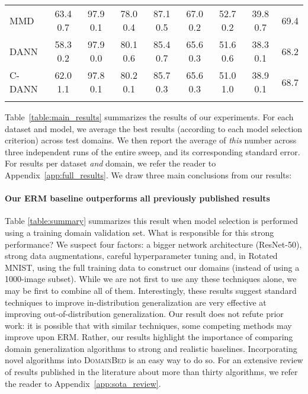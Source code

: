 \documentclass{article}
\newcommand{\domainbed}{\textsc{DomainBed}\xspace}
\newcommand{\coloredBelowRuleSep}[1]{
    \arrayrulecolor{#1}
    \specialrule{\belowrulesep}{0pt}{0pt}
    \arrayrulecolor{black}
}
\newcommand{\coloredBottomrule}[1]{
    \arrayrulecolor{#1}
    \specialrule{\aboverulesep}{0pt}{0pt}
    \arrayrulecolor{black}
    \specialrule{\heavyrulewidth}{0pt}{0pt}
    \coloredBelowRuleSep{white}
}
\begin{document}
\begin{table}
\begin{center}
{\begin{tabular}{lcccccccc}
MMD                       & 63.4  0.7            & 97.9  0.1            & 78.0  0.4            & 87.1  0.5            & 67.0  0.2            & 52.7  0.2            & 39.8  0.7 & 69.4\\
DANN                      & 58.3  0.2            & 97.9  0.0            & 80.1  0.6            & 85.4  0.7            & 65.6  0.3            & 51.6  0.6            & 38.3  0.1 & 68.2\\
C-DANN                    & 62.0  1.1            & 97.8  0.1            & 80.2  0.1            & 85.7  0.3            & 65.6  0.3            & 51.0  1.0            & 38.9  0.1 & 68.7\\
\coloredBottomrule{alternateRowColor}
\end{tabular}}
\end{center}
\end{table}

Table~\ref{table:main_results} summarizes the results of our experiments.
For each dataset and model, we average the best results (according to each model selection criterion) across test domains. We then report the average of \textit{this} number across three independent runs of the entire sweep, and its corresponding standard error.
For results per dataset \emph{and} domain, we refer the reader to Appendix~\ref{app:full_results}.
We draw three main conclusions from our results:

\paragraph{Our ERM baseline outperforms all previously published results}
Table \ref{table:summary} summarizes this result when model selection is performed using a training domain validation set.
What is responsible for this strong performance?
We suspect four factors: a bigger network architecture (ResNet-50), strong data augmentations, careful hyperparameter tuning and, in Rotated MNIST, using the full training data to construct our domains (instead of using a 1000-image subset).
While we are not first to use any these techniques alone, we may be first to combine all of them.
Interestingly, these results suggest standard techniques to improve in-distribution generalization are very effective at improving out-of-distribution generalization.
Our result does not refute prior work: it is possible that with similar techniques, some competing methods may improve upon ERM.
Rather, our results highlight the importance of comparing domain generalization algorithms to strong and realistic baselines.
Incorporating novel algorithms into \domainbed is an easy way to do so.
For an extensive review of results published in the literature about more than thirty algorithms, we refer the reader to Appendix~\ref{app:sota_review}.
\end{document}
